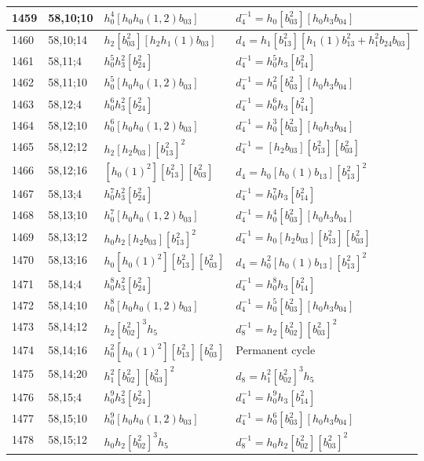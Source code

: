 \documentclass{article}
\begin{document}
\begin{longtable}{|l|l|>{\raggedright\arraybackslash}p{6cm}|>{\raggedright\arraybackslash}p{6cm}|}
\hline
1459 & 58,10;10 & $h_0^4[h_0h_0(1, 2)b_{03}]$ & $d_{4}^{-1}=h_0[b_{03}^2][h_0h_3b_{04}]$\\
\hline
1460 & 58,10;14 & $h_2[b_{03}^2][h_2h_1(1)b_{03}]$ &$d_{4}=h_1[b_{13}^2][h_1(1)b_{13}^2 + h_1^2b_{24}b_{03}]$\\
\hline
1461 & 58,11;4 & $h_0^5h_3^2[b_{24}^2]$ & $d_{4}^{-1}=h_0^5h_3[b_{14}^2]$\\
\hline
1462 & 58,11;10 & $h_0^5[h_0h_0(1, 2)b_{03}]$ & $d_{4}^{-1}=h_0^2[b_{03}^2][h_0h_3b_{04}]$\\
\hline
1463 & 58,12;4 & $h_0^6h_3^2[b_{24}^2]$ & $d_{4}^{-1}=h_0^6h_3[b_{14}^2]$\\
\hline
1464 & 58,12;10 & $h_0^6[h_0h_0(1, 2)b_{03}]$ & $d_{4}^{-1}=h_0^3[b_{03}^2][h_0h_3b_{04}]$\\
\hline
1465 & 58,12;12 & $h_2[h_2b_{03}][b_{13}^2]^2$ & $d_{4}^{-1}=[h_2b_{03}][b_{13}^2][b_{03}^2]$\\
\hline
1466 & 58,12;16 & $[h_0(1)^2][b_{13}^2][b_{03}^2]$ &$d_{4}=h_0[h_0(1)b_{13}][b_{13}^2]^2$\\
\hline
1467 & 58,13;4 & $h_0^7h_3^2[b_{24}^2]$ & $d_{4}^{-1}=h_0^7h_3[b_{14}^2]$\\
\hline
1468 & 58,13;10 & $h_0^7[h_0h_0(1, 2)b_{03}]$ & $d_{4}^{-1}=h_0^4[b_{03}^2][h_0h_3b_{04}]$\\
\hline
1469 & 58,13;12 & $h_0h_2[h_2b_{03}][b_{13}^2]^2$ & $d_{4}^{-1}=h_0[h_2b_{03}][b_{13}^2][b_{03}^2]$\\
\hline
1470 & 58,13;16 & $h_0[h_0(1)^2][b_{13}^2][b_{03}^2]$ &$d_{4}=h_0^2[h_0(1)b_{13}][b_{13}^2]^2$\\
\hline
1471 & 58,14;4 & $h_0^8h_3^2[b_{24}^2]$ & $d_{4}^{-1}=h_0^8h_3[b_{14}^2]$\\
\hline
1472 & 58,14;10 & $h_0^8[h_0h_0(1, 2)b_{03}]$ & $d_{4}^{-1}=h_0^5[b_{03}^2][h_0h_3b_{04}]$\\
\hline
1473 & 58,14;12 & $h_2[b_{02}^2]^3h_5$ & $d_{8}^{-1}=h_2[b_{02}^2][b_{03}^2]^2$\\
\hline
1474 & 58,14;16 & $h_0^2[h_0(1)^2][b_{13}^2][b_{03}^2]$ & Permanent cycle\\
\hline
1475 & 58,14;20 & $h_1^2[b_{02}^2][b_{03}^2]^2$ &$d_{8}=h_1^2[b_{02}^2]^3h_5$\\
\hline
1476 & 58,15;4 & $h_0^9h_3^2[b_{24}^2]$ & $d_{4}^{-1}=h_0^9h_3[b_{14}^2]$\\
\hline
1477 & 58,15;10 & $h_0^9[h_0h_0(1, 2)b_{03}]$ & $d_{4}^{-1}=h_0^6[b_{03}^2][h_0h_3b_{04}]$\\
\hline
1478 & 58,15;12 & $h_0h_2[b_{02}^2]^3h_5$ & $d_{8}^{-1}=h_0h_2[b_{02}^2][b_{03}^2]^2$\\

\end{longtable}
\end{document}
